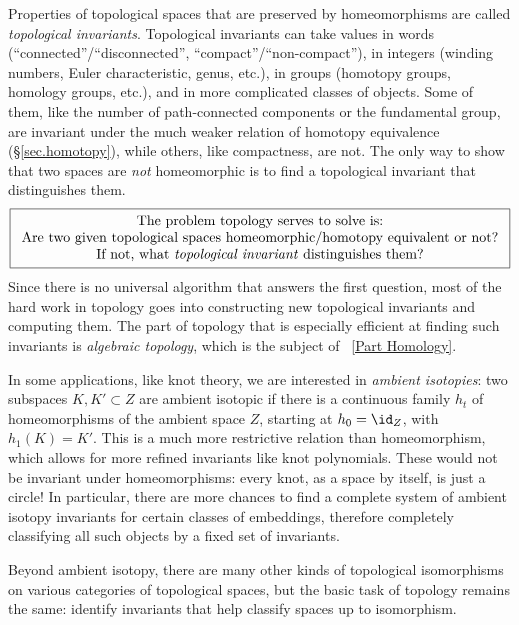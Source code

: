 Properties of topological spaces that are preserved by homeomorphisms are called \emph{topological invariants}. Topological invariants can take values in words (``connected''/``disconnected'', ``compact''/``non-compact''), in integers (winding numbers, Euler characteristic, genus, etc.), in groups (homotopy groups, homology groups, etc.), and in more complicated classes of objects. Some of them, like the number of path-connected components or the fundamental group, are invariant under the much weaker relation of homotopy equivalence (\S\ref{sec.homotopy}), while others, like compactness, are not. The only way to show that two spaces are \emph{not} homeomorphic is to find a topological invariant that distinguishes them.
\begin{gather*}
    \boxed{\begin{array}{c}
    \text{The problem topology serves to solve is:}\\
    \text{Are two given topological spaces homeomorphic/homotopy equivalent or not?}\\
    \text{If not, what \emph{topological invariant} distinguishes them?}
    \end{array}}
\end{gather*}
Since there is no universal algorithm that answers the first question, most of the hard work in topology goes into constructing new topological invariants and computing them. The part of topology that is especially efficient at finding such invariants is \emph{algebraic topology}, which is the subject of \Part~\ref{Part Homology}.

\begin{rem}
    In some applications, like knot theory, we are interested in \emph{ambient isotopies}: two subspaces $K,K'\subset Z$ are ambient isotopic if there is a continuous family $h_t$ of homeomorphisms of the ambient space $Z$, starting at $h_0=\id_Z$, with $h_1(K)=K'$. This is a much more restrictive relation than homeomorphism, which allows for more refined invariants like knot polynomials. These would not be invariant under homeomorphisms: every knot, as a space by itself, is just a circle! In particular, there are more chances to find a complete system of ambient isotopy invariants for certain classes of embeddings, therefore completely classifying all such objects by a fixed set of invariants.

    Beyond ambient isotopy, there are many other kinds of topological isomorphisms on various categories of topological spaces, but the basic task of topology remains the same: identify invariants that help classify spaces up to isomorphism.
\end{rem}


